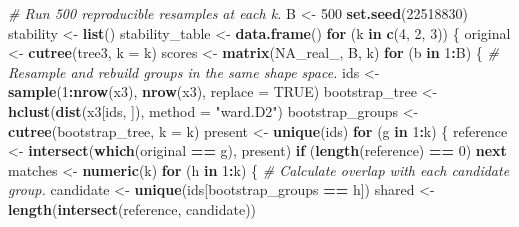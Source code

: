 \documentclass[
  10pt,
]{article}
\newenvironment{Shaded}{\begin{snugshade}}{\end{snugshade}}
\newcommand{\AttributeTok}[1]{\textcolor[rgb]{0.13,0.29,0.53}{#1}}
\newcommand{\CommentTok}[1]{\textcolor[rgb]{0.56,0.35,0.01}{\textit{#1}}}
\newcommand{\ConstantTok}[1]{\textcolor[rgb]{0.56,0.35,0.01}{#1}}
\newcommand{\ControlFlowTok}[1]{\textcolor[rgb]{0.13,0.29,0.53}{\textbf{#1}}}
\newcommand{\DecValTok}[1]{\textcolor[rgb]{0.00,0.00,0.81}{#1}}
\newcommand{\FunctionTok}[1]{\textcolor[rgb]{0.13,0.29,0.53}{\textbf{#1}}}
\newcommand{\NormalTok}[1]{#1}
\newcommand{\OtherTok}[1]{\textcolor[rgb]{0.56,0.35,0.01}{#1}}
\newcommand{\SpecialCharTok}[1]{\textcolor[rgb]{0.81,0.36,0.00}{\textbf{#1}}}
\newcommand{\StringTok}[1]{\textcolor[rgb]{0.31,0.60,0.02}{#1}}
\begin{document}
\begin{Shaded}
\begin{Highlighting}[]
\CommentTok{\# Run 500 reproducible resamples at each k.}
\NormalTok{B }\OtherTok{\textless{}{-}} \DecValTok{500}
\FunctionTok{set.seed}\NormalTok{(}\DecValTok{22518830}\NormalTok{)}
\NormalTok{stability }\OtherTok{\textless{}{-}} \FunctionTok{list}\NormalTok{()}
\NormalTok{stability\_table }\OtherTok{\textless{}{-}} \FunctionTok{data.frame}\NormalTok{()}
\ControlFlowTok{for}\NormalTok{ (k }\ControlFlowTok{in} \FunctionTok{c}\NormalTok{(}\DecValTok{4}\NormalTok{, }\DecValTok{2}\NormalTok{, }\DecValTok{3}\NormalTok{)) \{}
\NormalTok{  original }\OtherTok{\textless{}{-}} \FunctionTok{cutree}\NormalTok{(tree3, }\AttributeTok{k =}\NormalTok{ k)}
\NormalTok{  scores }\OtherTok{\textless{}{-}} \FunctionTok{matrix}\NormalTok{(}\ConstantTok{NA\_real\_}\NormalTok{, B, k)}
  \ControlFlowTok{for}\NormalTok{ (b }\ControlFlowTok{in} \DecValTok{1}\SpecialCharTok{:}\NormalTok{B) \{}
    \CommentTok{\# Resample and rebuild groups in the same shape space.}
\NormalTok{    ids }\OtherTok{\textless{}{-}} \FunctionTok{sample}\NormalTok{(}\DecValTok{1}\SpecialCharTok{:}\FunctionTok{nrow}\NormalTok{(x3), }\FunctionTok{nrow}\NormalTok{(x3), }\AttributeTok{replace =} \ConstantTok{TRUE}\NormalTok{)}
\NormalTok{    bootstrap\_tree }\OtherTok{\textless{}{-}} \FunctionTok{hclust}\NormalTok{(}\FunctionTok{dist}\NormalTok{(x3[ids, ]), }\AttributeTok{method =} \StringTok{"ward.D2"}\NormalTok{)}
\NormalTok{    bootstrap\_groups }\OtherTok{\textless{}{-}} \FunctionTok{cutree}\NormalTok{(bootstrap\_tree, }\AttributeTok{k =}\NormalTok{ k)}
\NormalTok{    present }\OtherTok{\textless{}{-}} \FunctionTok{unique}\NormalTok{(ids)}
    \ControlFlowTok{for}\NormalTok{ (g }\ControlFlowTok{in} \DecValTok{1}\SpecialCharTok{:}\NormalTok{k) \{}
\NormalTok{      reference }\OtherTok{\textless{}{-}} \FunctionTok{intersect}\NormalTok{(}\FunctionTok{which}\NormalTok{(original }\SpecialCharTok{==}\NormalTok{ g), present)}
      \ControlFlowTok{if}\NormalTok{ (}\FunctionTok{length}\NormalTok{(reference) }\SpecialCharTok{==} \DecValTok{0}\NormalTok{) }\ControlFlowTok{next}
\NormalTok{      matches }\OtherTok{\textless{}{-}} \FunctionTok{numeric}\NormalTok{(k)}
      \ControlFlowTok{for}\NormalTok{ (h }\ControlFlowTok{in} \DecValTok{1}\SpecialCharTok{:}\NormalTok{k) \{}
        \CommentTok{\# Calculate overlap with each candidate group.}
\NormalTok{        candidate }\OtherTok{\textless{}{-}} \FunctionTok{unique}\NormalTok{(ids[bootstrap\_groups }\SpecialCharTok{==}\NormalTok{ h])}
\NormalTok{        shared }\OtherTok{\textless{}{-}} \FunctionTok{length}\NormalTok{(}\FunctionTok{intersect}\NormalTok{(reference, candidate))}

\end{Highlighting}
\end{Shaded}
\end{document}
